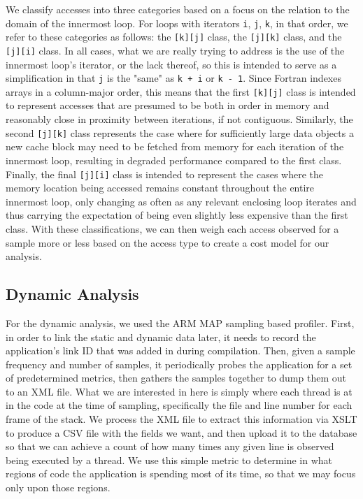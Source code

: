 We classify accesses into three categories based on a focus on the relation to the domain of the innermost loop.
For loops with iterators \texttt{i}, \texttt{j}, \texttt{k}, in that order, we refer to these categories as follows: the \texttt{[k][j]} class, the \texttt{[j][k]} class, and the \texttt{[j][i]} class.
In all cases, what we are really trying to address is the use of the innermost loop's iterator, or the lack thereof, so this is intended to serve as a simplification in that \texttt{j} is the "same" as \texttt{k + i} or \texttt{k - 1}.
Since Fortran indexes arrays in a column-major order, this means that the first \texttt{[k][j]} class is intended to represent accesses that are presumed to be both in order in memory and reasonably close in proximity between iterations, if not contiguous.
Similarly, the second \texttt{[j][k]} class represents the case where for sufficiently large data objects a new cache block may need to be fetched from memory for each iteration of the innermost loop, resulting in degraded performance compared to the first class.
Finally, the final \texttt{[j][i]} class is intended to represent the cases where the memory location being accessed remains constant throughout the entire innermost loop, only changing as often as any relevant enclosing loop iterates and thus carrying the expectation of being even slightly less expensive than the first class.
With these classifications, we can then weigh each access observed for a sample more or less based on the access type to create a cost model for our analysis.%
\subsection{Dynamic Analysis}
For the dynamic analysis, we used the ARM MAP sampling based profiler.
First, in order to link the static and dynamic data later, it needs to record the application's link ID that was added in during compilation.
Then, given a sample frequency and number of samples, it periodically probes the application for a set of predetermined metrics, then gathers the samples together to dump them out to an \acs{XML} file.
What we are interested in here is simply where each thread is at in the code at the time of sampling, specifically the file and line number for each frame of the stack.
We process the \acs{XML} file to extract this information via \ac{XSLT} to produce a \acs{CSV} file with the fields we want, and then upload it to the database so that we can achieve a count of how many times any given line is observed being executed by a thread.
We use this simple metric to determine in what regions of code the application is spending most of its time, so that we may focus only upon those regions.


